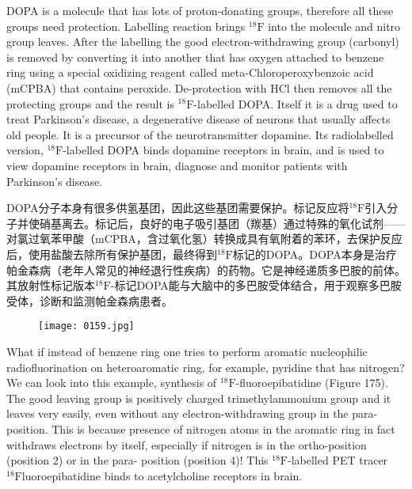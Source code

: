 \documentclass[dvipsnames, svgnames,a4paper,11pt]{article}
\begin{document}
DOPA is a molecule that has lots of proton-donating groups, therefore all these
groups need protection. Labelling reaction brings ${}^\mathrm{18}\mathrm{F}$ into the molecule and nitro
group leaves. After the labelling the good electron-withdrawing group (carbonyl) is
removed by converting it into another that has oxygen attached to benzene ring
using a special oxidizing reagent called meta-Chloroperoxybenzoic acid (mCPBA)
that contains peroxide. De-protection with HCl then removes all the protecting
groups and the result is ${}^\mathrm{18}\mathrm{F}$-labelled DOPA. Itself it is a drug used to treat
Parkinson’s disease, a degenerative disease of neurons that usually affects old
people. It is a precursor of the neurotransmitter dopamine. Its radiolabelled version,
${}^\mathrm{18}\mathrm{F}$-labelled DOPA binds dopamine receptors in brain, and is used to view dopamine
receptors in brain, diagnose and monitor patients with Parkinson’s disease.

DOPA分子本身有很多供氢基团，因此这些基团需要保护。标记反应将${}^\mathrm{18}\mathrm{F}$引入分子并使硝基离去。标记后，良好的电子吸引基团（羰基）通过特殊的氧化试剂——对氯过氧苯甲酸（mCPBA，含过氧化氢）转换成具有氧附着的苯环，去保护反应后，使用盐酸去除所有保护基团，最终得到${}^\mathrm{18}\mathrm{F}$标记的DOPA。DOPA本身是治疗帕金森病（老年人常见的神经退行性疾病）的药物。它是神经递质多巴胺的前体。其放射性标记版本${}^\mathrm{18}\mathrm{F}$-标记DOPA能与大脑中的多巴胺受体结合，用于观察多巴胺受体，诊断和监测帕金森病患者。

\begin{figure}[h]
	\centering
    \texttt{[image: 0159.jpg]}    
     \label{fig174}
\end{figure}


What if instead of benzene ring one tries to perform aromatic nucleophilic
radiofluorination on heteroaromatic ring, for example, pyridine that has nitrogen? We
can look into this example, synthesis of ${}^\mathrm{18}\mathrm{F}$-fluoroepibatidine (Figure 175). The good
leaving group is positively charged trimethylammonium group and it leaves very
easily, even without any electron-withdrawing group in the para-position. This is
because presence of nitrogen atoms in the aromatic ring in fact withdraws electrons by itself, especially if nitrogen is in the ortho-position (position 2) or in the para-
position (position 4)! This ${}^\mathrm{18}\mathrm{F}$-labelled PET tracer ${}^\mathrm{18}\mathrm{F}$luoroepibatidine binds to
acetylcholine receptors in brain.
\end{document}
